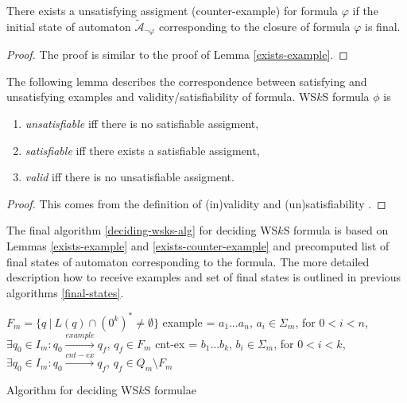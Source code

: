 \begin{lemma}
There exists a unsatisfying assigment (counter-example) for formula $\varphi$ if
the initial state of automaton $\widetilde{\mathcal{A}}_{\neg\varphi}$
corresponding to the closure of formula $\varphi$ is final.
\end{lemma}

\begin{proof}
The proof is similar to the proof of Lemma \ref{exists-example}.
\end{proof}

\begin{lemma}\label{exists-counter-example}
The following lemma describes the correspondence between satisfying and
unsatisfying examples and validity/satisfiability of formula. WS$k$S formula
$\phi$ is
\begin{enumerate}
  \item \emph{unsatisfiable} iff there is no satisfiable assigment,
  \item \emph{satisfiable} iff there exists a satisfiable assigment,
  \item \emph{valid} iff there is no unsatisfiable assigment.
\end{enumerate}
\end{lemma}
\begin{proof}
This comes from the definition of (in)validity and (un)satisfiability
\cite{sat}.
\end{proof}

The final algorithm \ref{deciding-wsks-alg} for deciding WS$k$S formula is based
on Lemmas \ref{exists-example} and \ref{exists-counter-example} and precomputed
list of final states of automaton corresponding to the formula. The more detailed
description how to receive examples and set of final states is outlined in
previous algorithms \ref{final-states}.

% 

\begin{algorithm}[hb!]
		\BlankLine
		$F_m = \{q\ |\ L(q) \cap (0^k)^* \neq \emptyset\}$\;
		example = $a_1\ldots a_n$, $a_i \in \Sigma_m$, for $0 < i < n$, $\exists q_0
		\in I_m: q_0 \overset{example}{\longrightarrow} q_f$, $q_f \in F_m$\;
		cnt-ex = $b_1\ldots b_k$, $b_i \in \Sigma_m$, for $0 < i < k$,
		$\exists q_0 \in I_m: q_0 \overset{cnt-ex}{\longrightarrow} q_f$, $q_f \in
		Q_m \setminus F_m$\;
		\caption{Algorithm for deciding WS$k$S formulae}\label{deciding-wsks-alg}
	\end{algorithm}

